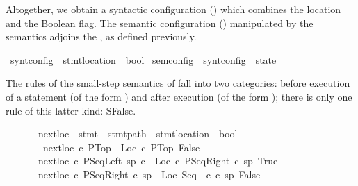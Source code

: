 \begin{isabellebody}
\begin{isamarkuptext}
Altogether, we obtain a syntactic configuration () which
combines the location and the Boolean flag. The semantic configuration () manipulated by the semantics adjoins the , as
defined previously.\end{isamarkuptext}\isamarkuptrue {}\isamarkupfalse \ synt{\isacharunderscore}config\ {\isacharequal}\ {\isachardoublequoteopen}stmt{\isacharunderscore}location\ {\isasymtimes}\ bool{\isachardoublequoteclose}\isanewline
{}\isamarkupfalse \ sem{\isacharunderscore}config\ {\isacharequal}\ {\isachardoublequoteopen}synt{\isacharunderscore}config\ {\isasymtimes}\ state{\isachardoublequoteclose}\begin{isamarkuptext}The rules of the small-step semantics of  fall
into two categories: before execution of a statement  (of the form ) and after execution (of the form );
there is only one rule of this latter kind: {\sc SFalse}.\end{isamarkuptext}\isamarkuptrue \begin{figure}[h!]
\isastyleminor\isamarkuptrue
\figline{}
\isamarkupfalse \ next{\isacharunderscore}loc\ {\isacharcolon}{\isacharcolon}\ {\isachardoublequoteopen}stmt\ {\isasymRightarrow}\ stmt{\isacharunderscore}path\ {\isasymRightarrow}\ {\isacharparenleft}stmt{\isacharunderscore}location\ {\isasymtimes}\ bool{\isacharparenright}{\isachardoublequoteclose}\ \isanewline
\ \ {\isachardoublequoteopen}next{\isacharunderscore}loc\ c\ PTop\ {\isacharequal}\ {\isacharparenleft}Loc\ c\ PTop{\isacharcomma}\ False{\isacharparenright}{\isachardoublequoteclose}\isanewline
{\isacharbar}\ {\isachardoublequoteopen}next{\isacharunderscore}loc\ c\ {\isacharparenleft}PSeqLeft\ sp\ c\ {\isacharequal}\ {\isacharparenleft}Loc\ c\ {\isacharparenleft}PSeqRight\ c\ sp{\isacharparenright}{\isacharcomma}\ True{\isacharparenright}{\isachardoublequoteclose}\isanewline
{\isacharbar}\ {\isachardoublequoteopen}next{\isacharunderscore}loc\ c\ {\isacharparenleft}PSeqRight\ c\ sp{\isacharparenright}\ {\isacharequal}\ {\isacharparenleft}Loc\ {\isacharparenleft}Seq\ \ c\ c{\isacharparenright}\ sp{\isacharcomma}\ False{\isacharparenright}{\isachardoublequoteclose}\isanewline

\end{figure}
\end{isabellebody}
